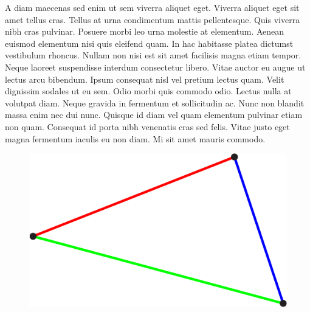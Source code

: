 \documentclass{PoliMi_MasterThesis}
\newcommand*\triangleLogo{
	\clearpage
	\thispagestyle{empty}
	\newpage
	\begin{figure}
		\centering
		\includegraphics[width=\textwidth]{Images/triangle_logo_thin.png} 
	\end{figure}
}
\begin{document}
A diam maecenas sed enim ut sem viverra aliquet eget. Viverra aliquet eget sit amet tellus cras. Tellus at urna condimentum mattis pellentesque. Quis viverra nibh cras pulvinar. Posuere morbi leo urna molestie at elementum. Aenean euismod elementum nisi quis eleifend quam. In hac habitasse platea dictumst vestibulum rhoncus. Nullam non nisi est sit amet facilisis magna etiam tempor. Neque laoreet suspendisse interdum consectetur libero. Vitae auctor eu augue ut lectus arcu bibendum. Ipsum consequat nisl vel pretium lectus quam. Velit dignissim sodales ut eu sem. Odio morbi quis commodo odio. Lectus nulla at volutpat diam. Neque gravida in fermentum et sollicitudin ac. Nunc non blandit massa enim nec dui nunc. Quisque id diam vel quam elementum pulvinar etiam non quam. Consequat id porta nibh venenatis cras sed felis. Vitae justo eget magna fermentum iaculis eu non diam. Mi sit amet mauris commodo.
\normalsize

\ClearShipoutPicture

\triangleLogo
\end{document}
